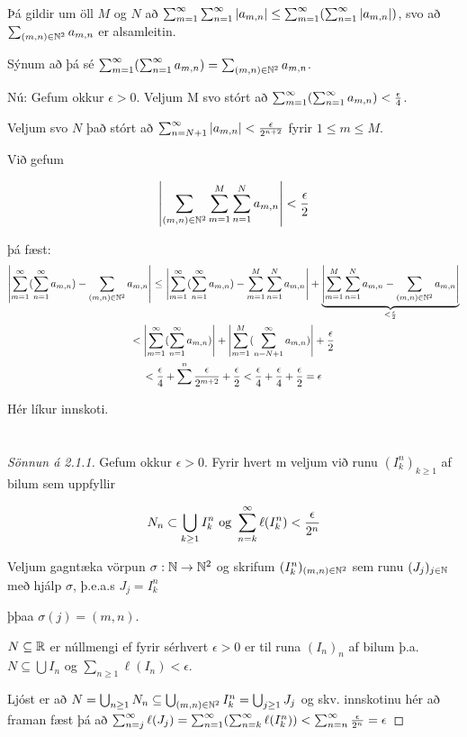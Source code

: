 \documentclass[12pt]{book}
\begin{document}
{

\def\mn{(m,n)}
\def\amn{a_{m,n}}
\def\summn{\sum_{\mn \in \N^2}}

Þá gildir um öll $M$ og $N$ að $\sum_{m=1}^{\infty} \sum_{n=1}^{\infty} \abs{\amn} \leq \summinfty (\sumoinfty \abs{\amn})$, svo að $\sum_{\mn \in \N^2} \amn$ er alsamleitin.

Sýnum að þá sé $\summinfty ( \sumoinfty \amn ) = \summn \amn$.

Nú: Gefum okkur $\epsilon > 0$. Veljum M svo stórt að $\summinfty ( \sumoinfty \amn ) < \eps{4}$.

Veljum svo $N$ það stórt að $\sum_{n = N+1}^{\infty} \abs{\amn} < \eps{2^{n+2}}$ fyrir $1 \leq m \leq M$.


Við gefum 

\[\abs{\sum_{(m,n) \in \N^2} \sum_{m=1}^M \sum_{n=1}^N \amn } < \eps{2} \]

þá fæst: 
\begin{gather*}
\abs{\summinfty ( \sumoinfty \amn) - \sum_{(m,n) \in \N^2} \amn}  \leq \abs{\summinfty ( \sumoinfty \amn) - \sum_{m=1}^{M} \sum_{n=1}^N \amn} + \underbrace{\abs{\sum_{m=1}^M \sum_{n=1}^N \amn - \sum_{(m,n) \in \N^2} \amn}}_{< \eps{2}}\\
< \abs{\summinfty ( \sumoinfty \amn)} + \abs{\sum_{m=1}^M ( \sum_{n = N+1}^{\infty} \amn)} + \eps{2}\\
< \eps{4} + \sum^n \eps{2^{m+2}} + \eps{2} < \eps{4} + \eps{4} + \eps{2} = \epsilon
\end{gather*}

Hér líkur innskoti.

}

\section{}

\begin{proof}[Sönnun á 2.1.1]

Gefum okkur $\epsilon > 0$. Fyrir hvert m veljum við runu $(I^n_k)_{k \geq 1}$ af bilum sem uppfyllir

\[N_n \subset \bigcup_{k \geq 1} I_k^n \text{ og } \sum_{n = {k}}^{\infty} \ell(I^n_k) < \frac{\epsilon}{2^n}\]

Veljum gagntæka vörpun $\sigma: \mathbb{N} \to \mathbb{N}^2$ og skrifum $(I^n_k)_{(m,n) \in \mathbb{N}^2}$ sem runu
$(J_j)_{j \in \mathbb{N}}$ með hjálp $\sigma$, þ.e.a.s $J_j = I^n_k$

þþaa $\sigma (j) = (m,n)$.

\begin{ath}
$N \subseteq \mathbb{R}$ er núllmengi ef fyrir sérhvert $\epsilon > 0$ er til runa $(I_n)_{n}$ af bilum þ.a.
$N \subseteq \bigcup I_n$ og $\sum_{n \geq 1} \ell(I_n) < \epsilon$.

\end{ath}

Ljóst er að $N = \bigcup_{n \geq 1} N_n \subseteq \bigcup_{(m,n) \in \mathbb{N}^2} I^n_k = \bigcup_{j \geq 1} J_j$
og skv. innskotinu hér að framan fæst þá að
$\sum_{n = {j}}^{\infty} \ell(J_j) = \sum_{n = 1}^{\infty} ( \sum_{n = {k}}^{\infty} \ell(I_k^n)) < \sum_{n = {n}}^{\infty} \frac{\epsilon}{2^n} = \epsilon$

\end{proof}
\end{document}
